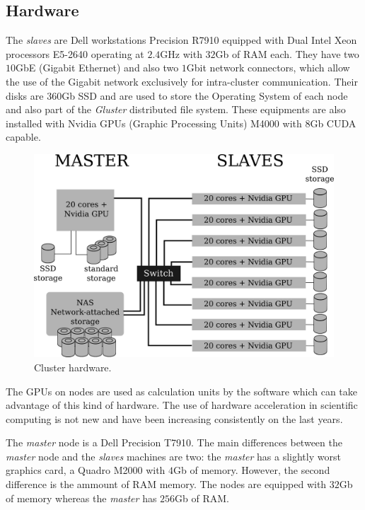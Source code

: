 \documentclass[twoside,a4paper,12pt,english]{inac19}
\begin{document}
\subsection{Hardware}

The \textit{slaves} are Dell workstations Precision R7910 equipped
with Dual Intel{\textregistered} Xeon{\textregistered} processors E5-2640 operating at $2.4$GHz with
$32$Gb of RAM each. They have two $10$GbE (Gigabit Ethernet) and also two $1$Gbit network connectors, which
allow the use of the Gigabit network exclusively for intra-cluster communication. Their disks are $360$Gb SSD
and are used to store the Operating System of each node and also part of the \textit{Gluster} distributed
file system. These equipments are also installed with Nvidia{\textregistered} GPUs (Graphic Processing Units) M4000{\textregistered} with $8$Gb CUDA\cite{CUDA} capable.

\begin{figure}[h] %
  \centering\includegraphics[scale=0.7]{images/cluster-topologico.png}
  \caption{Cluster hardware.}
  \label{fig:cluster}
\end{figure}

The GPUs on nodes are used as calculation units by the software which can take advantage of this kind of hardware.
The use of hardware acceleration in scientific computing is not new and have been increasing consistently on the
last years\cite{accelerators}.

The \textit{master} node is a Dell Precision T7910. The main
differences between the \textit{master} node and the \textit{slaves} machines are two: the \textit{master} has
a slightly worst graphics card, a Quadro{\textregistered} M2000 with $4$Gb of memory. However, the second difference
is the ammount of RAM memory. The nodes are equipped with $32$Gb of memory whereas the \textit{master} has
$256$Gb of RAM.
\end{document}
